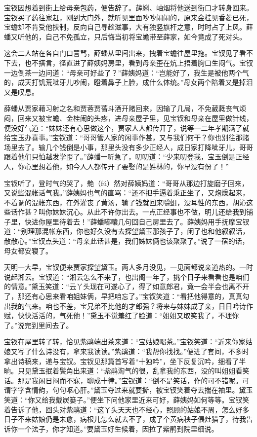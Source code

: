 \documentclass[12pt,oneside]{book}
\begin{document}
宝钗因想着到街上给母亲包药，便告辞了。薛蝌、岫烟将他送到街口才转身回来。宝钗买了药往家赶，刚到大门外，就听见里面吵吵闹闹的，原来金桂见香菱已死，宝蟾却不肯受他挟制，反向自己寻趁滋事，大有独竖旗杆之意，时时占了上风。薛蟠又听他的，自己不免孤立，只后悔当初将宝蟾带至薛家，如今竟成了死对头。

这会二人站在各自门口詈骂，薛蟠从里间出来，拽着宝蟾往屋里拖。宝钗见了看不下去，也不搭言，径直进了薛姨妈房里，看到母亲歪在炕上捂着胸口生闷气。宝钗一边倒茶一边问道：“母亲可好些了？”薛姨妈道：“岂能好了，我生是被他两个气的，成天打饥荒呲牙儿吵闹，瞪着鼻子上脸，成什么体统。”母女两个陪着又是掉泪又是叹息。

薛蟠从贾家藉习射之名和贾蓉贾蔷斗酒开赌回来，因输了几局，不免葳蕤丧气烦闷，回来又被宝蟾、金桂闹的头疼，进母亲屋子里，见宝钗和母亲在屋里做针线，便没好气道：“妹妹还有心思做这个，贾家人人都传开了，说等一二年孝期满了就给宝玉办喜事。”宝钗道：“哥哥管人家的闲事作甚，又与我们何干？你也别往那赌场里去了。输几个钱倒是小事，那里头没有多少正经人，成日家打降呲牙儿，哥哥跟着他们只怕越发学歪了。”薛蟠一听急了，叨叨道：“少来叨登我，宝玉倒是正经人，你心里想着他，如今人人都传开了要娶的是姓林的，你早没有份了！”

宝钗听了，登时气的哭了，艴（fú）然对薛姨妈道：“哥哥从那边打旋磨子回来，又说些混帐话气我。”薛姨妈也气的直骂：“还不把手逼着秉正坐了，又炮燥起来，不着调的混帐东西，在外灌丧了黄汤，输了钱就回来嚼蛆，没耳性的东西，胡沁这些话作甚？叫你妹妹沉心。从此不许你出去。一点正经事也不做，明儿还给我到铺子里，快进你屋里待着去！”薛蟠嘟囔几句回自己房里去了。薛姨妈用手抚摩宝钗道：“别理那混帐东西，你也好久没有去探望黛玉那孩子了，闲了也和他叙叙话，散散心。”宝钗点头道：“母亲此话甚是，我们姊妹俩也该聚聚了。”说了一宿的话，母女都安寝了。

天明一大早，宝钗便来贾家探望黛玉。两人多月没见，一见面都说亲道热的。一时说起湘云。宝钗道：“湘云怎么不来了，也出阁一年了，挑个日子来看看也是咱们的情意。”黛玉笑道：“云丫头现在可遂心了，得了如意郎君，竟一会半会也离不开了，那还有心思来看咱姐妹俩，早把咱忘了。”宝钗笑道：“看把他得意的，真真勾出我的气来。咱也不差，宝兄弟不比他的才郎强？将来与妹妹成了亲，日日吟诗作赋，快快活活的，气死他！”黛玉不觉羞红了脸道：“姐姐又取笑我了，不理你了。”说完到里间去了。

宝钗在屋里转了转，恰见紫鹃端出茶来道：“宝姑娘喝茶。”宝钗笑道：“近来你家姑娘又写了什么诗没有，拿来我读读。”紫鹃道：“我帮你找找。”便进了套间，不多时拿出诗稿来，递与宝钗。宝钗见那篇首写着“十独吟”，坐下反复沉吟，细看了半晌。只见黛玉抿着鬓角出来道：“紫鹃淘气的很，乱拿我的东西，没的叫姐姐看笑话。那是我闲日闷而不寐，聊成十律。”宝钗道：“倒不是笑话，作的可不错呢。可谓字字含情韵，句句呕心肝。”黛玉夺过来就要撕，被宝钗笑着夺去揣在袖里。黛玉笑道：“你又给我戴炭篓子。”便坐下问他家里近来可好，薛姨妈如何等等。宝钗笑着告诉了他，回头对紫鹃道：“这丫头天天也不经心，照顾的姑娘不周，怎么好多日子不来姑娘仍是未愈，病根儿怎么就去不了，成了个黄病秧子偎灶猫了，待我告诉你一个法子，你才知道。”要黛玉好生候着，因拉了紫鹃到院里细说。
\end{document}
